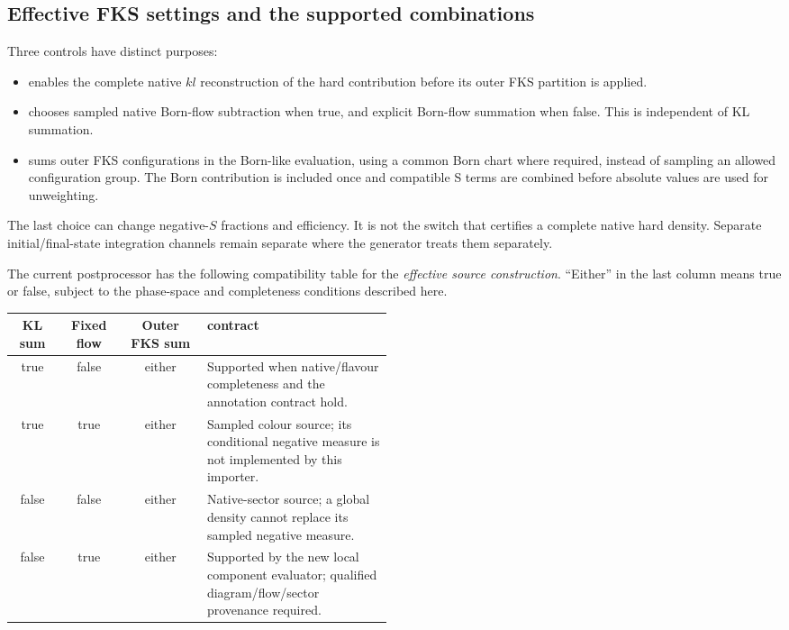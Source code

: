 \subsection{Effective FKS settings and the supported combinations}
\label{sec:source-settings}

Three controls have distinct purposes:
\begin{itemize}
 \item {} enables the complete native
       $kl$ reconstruction of the hard contribution before its outer
       FKS partition is applied.
 \item {} chooses sampled native
       Born-flow subtraction when true, and explicit Born-flow summation
       when false. This is independent of KL summation.
 \item {} sums outer FKS configurations in
       the Born-like evaluation, using a common Born chart where required,
       instead of sampling an allowed configuration group. The Born
       contribution is included once and compatible S terms are combined
       before absolute values are used for unweighting.
\end{itemize}
The last choice can change negative-$S$ fractions and efficiency. It is
not the switch that certifies a complete native hard density. Separate
initial/final-state integration channels remain separate where the
generator treats them separately.

The current postprocessor has the following compatibility
table for the \emph{effective source construction}. ``Either'' in the last
column means true or false, subject to the phase-space and completeness
conditions described here.
\begin{center}
\small
\begin{tabular}{@{}cccp{0.49\linewidth}@{}}
\toprule
KL sum & Fixed flow & Outer FKS sum & \macnlops{} contract \\
\midrule
true  & false & either & Supported when native/flavour completeness and
                         the annotation contract hold. \\
true  & true  & either & Sampled colour source; its conditional negative
                         measure is not implemented by this importer. \\
false & false & either & Native-sector source; a global density cannot
                         replace its sampled negative measure. \\
false & true  & either & Supported by the new local component evaluator;
                         qualified diagram/flow/sector provenance required. \\
\bottomrule
\end{tabular}
\end{center}


